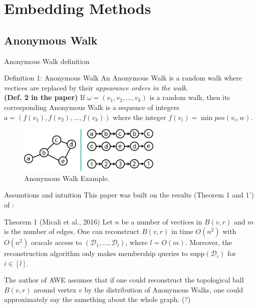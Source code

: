\documentclass{beamer}
\begin{document}
    \section{Embedding Methods}

    \subsection{Anonymous Walk}

    \begin{frame}{Anonymous Walk definition}
       \begin{block}{Definition 1: Anonymous Walk}
            \textcolor{example}{An Anonymous Walk} is a random walk where 
            vectices are replaced by their 
            \emph{appearance orders in the walk}. \\
            \textbf{(Def. 2 in the paper)} If $\omega = (v_1, v_2, ... , v_k)$ is a
            random walk, then its corresponding Anonymous Walk is a sequence
            of integers $a = (f(v_1), f(v_2), ... , f(v_k))$ where the integer 
            $f(v_i) = \min pos(v_i, w)$.
       \end{block} 

        \begin{figure}
            \centering
            \includegraphics[height=6em]{imgs/anonwalkexample.pdf}
            \caption{Anonymous Walk Example.}
            \label{fig:anonwalkexample}
        \end{figure}
    \end{frame}

    \begin{frame}{Assumtions and intuition}
        This paper was built on the results (Theorem 1 and 1') of 
        \cite{micali2016reconstructing}:

        \begin{block}{Theorem 1 (Micali et al., 2016)}
            Let $n$ be a number of vectices in $B(v,r)$ and $m$ is the number
            of edges. One can reconstruct $B(v,r)$ in time $O(n^2)$ with 
            $O(n^2)$ oracale access to $(\mathcal{D}_1, ... , \mathcal{D}_l)$,
            where $l = O(m)$. Moreover, the reconstruction algorithm only makes 
            membership queries to $\text{supp}(\mathcal{D}_i)$ for $i \in [l]$.
        \end{block}

        \vspace{1em}

        The author of AWE assumes that if one could reconstruct the topological
        ball $B(v,r)$ around vertex $v$ by the distribution of Anonymous Walks, 
        one could approximately say the samething about the whole graph. (?)
    \end{frame}
\end{document}
